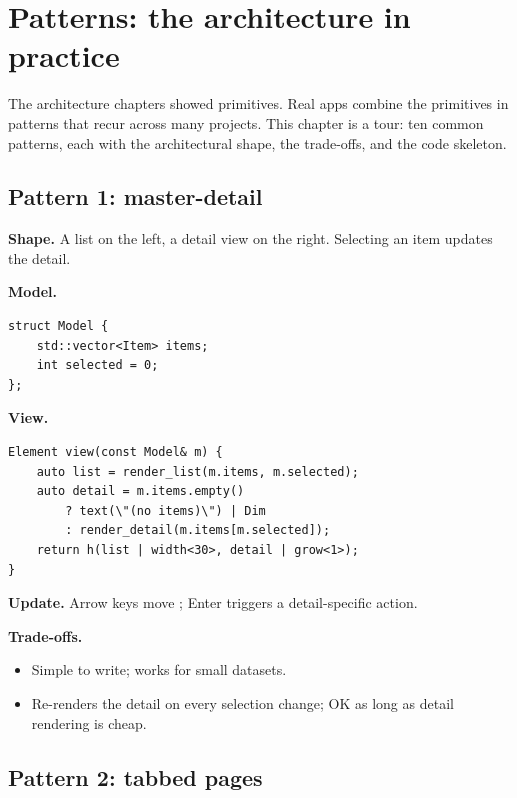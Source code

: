 \chapter{Patterns: the architecture in practice}
\label{ch:patterns}

\begin{aside}
The architecture chapters showed primitives. Real apps combine
the primitives in patterns that recur across many projects. This
chapter is a tour: ten common patterns, each with the
architectural shape, the trade-offs, and the code skeleton.
\end{aside}

\section{Pattern 1: master-detail}

\textbf{Shape.} A list on the left, a detail view on the right.
Selecting an item updates the detail.

\textbf{Model.}

\begin{lstlisting}
struct Model {
    std::vector<Item> items;
    int selected = 0;
};
\end{lstlisting}

\textbf{View.}

\begin{lstlisting}
Element view(const Model& m) {
    auto list = render_list(m.items, m.selected);
    auto detail = m.items.empty()
        ? text(\"(no items)\") | Dim
        : render_detail(m.items[m.selected]);
    return h(list | width<30>, detail | grow<1>);
}
\end{lstlisting}

\textbf{Update.} Arrow keys move ; Enter triggers
a detail-specific action.

\textbf{Trade-offs.}

\begin{itemize}[leftmargin=*]
  \item Simple to write; works for small datasets.
  \item Re-renders the detail on every selection change; OK as
    long as detail rendering is cheap.
\end{itemize}

\section{Pattern 2: tabbed pages}

